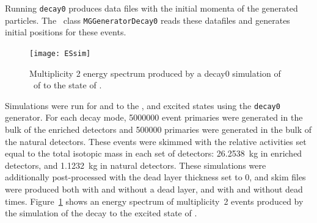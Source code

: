 \documentclass[/main.tex]{subfiles}
\begin{document}
Running \texttt{decay0} produces data files with the initial momenta of the generated particles.
The \Mage\ class \texttt{MGGeneratorDecay0} reads these datafiles and generates initial positions for these events.
\\
\begin{figure}[h]
  \centering
  \texttt{[image: ESsim]}
  \caption[Simulation of multiplicty 2 events from \tnbb\ to ]{\label{fig:2dessim}
    Multiplicity 2 energy spectrum produced by a decay0 simulation of \tnbb\ of  to the  state of .
  }
\end{figure}
Simulations were run for  \tnbb and \znbb to the  ,  and  excited states using the \texttt{decay0} generator.
For each decay mode, 5000000 event primaries were generated in the bulk of the enriched detectors and 500000 primaries were generated in the bulk of the natural detectors.
These events were skimmed with the relative activities set equal to the total isotopic mass in each set of detectors: 26.2538~kg in enriched detectors, and 1.1232~kg in natural detectors.
These simulations were additionally post-processed with the dead layer thickness set to 0, and skim files were produced both with and without a dead layer, and with and without dead times.
Figure~\ref{fig:2dessim} shows an energy spectrum of multiplicity~2 events produced by the simulation of the  decay to the  excited state of .
\\
\end{document}
